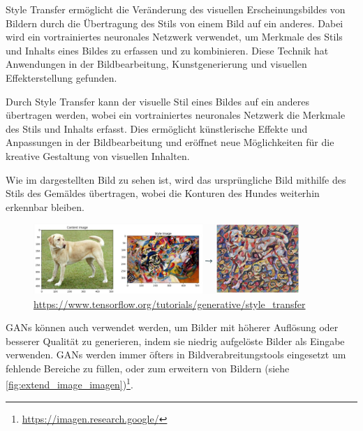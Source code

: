         Style Transfer ermöglicht die Veränderung des visuellen Erscheinungsbildes von Bildern durch die Übertragung des Stils von einem Bild auf ein anderes.
        Dabei wird ein vortrainiertes neuronales Netzwerk verwendet, um Merkmale des Stils und Inhalts eines Bildes zu erfassen und zu kombinieren.
        Diese Technik hat Anwendungen in der Bildbearbeitung, Kunstgenerierung und visuellen Effekterstellung gefunden.
        
        Durch Style Transfer kann der visuelle Stil eines Bildes auf ein anderes übertragen werden, wobei ein vortrainiertes neuronales Netzwerk die Merkmale des Stils und Inhalts erfasst.
        Dies ermöglicht künstlerische Effekte und Anpassungen in der Bildbearbeitung und eröffnet neue Möglichkeiten für die kreative Gestaltung von visuellen Inhalten.

        Wie im dargestellten Bild zu sehen ist, wird das ursprüngliche Bild mithilfe des Stils des Gemäldes übertragen, wobei die Konturen des Hundes weiterhin erkennbar bleiben.

        \begin{figure}[h]
            \centering
            \includegraphics[width=0.9\textwidth]{img/GAN_style_trtansfer.jpg}
            \caption{\url{https://www.tensorflow.org/tutorials/generative/style_transfer}}
            \label{fig:GAN_style_transfer}
        \end{figure}
        
        GANs können auch verwendet werden, um Bilder mit höherer Auflösung oder besserer Qualität zu generieren, indem sie niedrig aufgelöste Bilder als Eingabe verwenden.
        GANs werden immer öfters in Bildverabreitungstools eingesetzt um fehlende Bereiche zu füllen, oder zum erweitern von Bildern (siehe \ref{fig:extend_image_imagen})\footnote{\url{https://imagen.research.google/}}.

